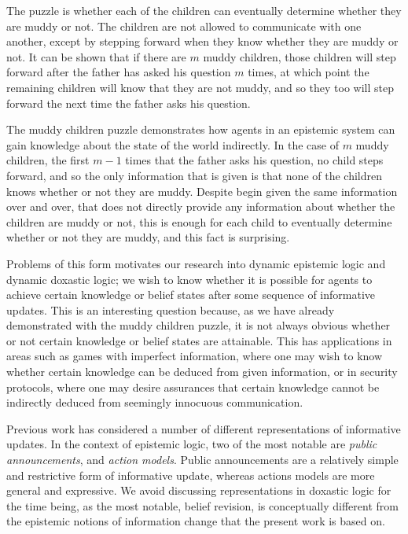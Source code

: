 The puzzle is whether each of the children can eventually determine whether
they are muddy or not. The children are not allowed to communicate with one
another, except by stepping forward when they know whether they are muddy or
not. It can be shown that if there are $m$ muddy children, those children will
step forward after the father has asked his question $m$ times, at which point
the remaining children will know that they are not muddy, and so they too will
step forward the next time the father asks his question.

The muddy children puzzle demonstrates how agents in an epistemic system can
gain knowledge about the state of the world indirectly. In the case of $m$ muddy
children, the first $m - 1$ times that the father asks his question, no child
steps forward, and so the only information that is given is that none of the
children knows whether or not they are muddy. Despite begin given the same
information over and over, that does not directly provide any information about
whether the children are muddy or not, this is enough for each child to
eventually determine whether or not they are muddy, and this fact is surprising.

Problems of this form motivates our research into dynamic epistemic logic and
dynamic doxastic logic; we wish to know whether it is possible for agents to
achieve certain knowledge or belief states after some sequence of informative
updates. This is an interesting question because, as we have already
demonstrated with the muddy children puzzle, it is not always obvious whether or
not certain knowledge or belief states are attainable. This has applications in
areas such as games with imperfect information, where one may wish to know
whether certain knowledge can be deduced from given information, or in security
protocols, where one may desire assurances that certain knowledge cannot be
indirectly deduced from seemingly innocuous communication.

Previous work has considered a number of different representations of
informative updates. In the context of epistemic logic, two of the most notable
are {\em public announcements}, and {\em action models}. Public announcements
are a relatively simple and restrictive form of informative update, whereas
actions models are more general and expressive. We avoid discussing
representations in doxastic logic for the time being, as the most notable,
belief revision, is conceptually different from the epistemic notions of
information change that the present work is based on.

